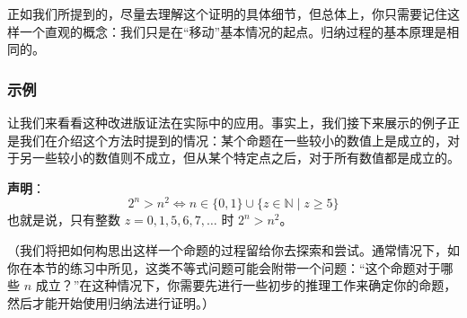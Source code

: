 正如我们所提到的，尽量去理解这个证明的具体细节，但总体上，你只需要记住这样一个直观的概念：我们只是在``移动''基本情况的起点。归纳过程的基本原理是相同的。

\subsubsection*{示例}

让我们来看看这种改进版证法在实际中的应用。事实上，我们接下来展示的例子正是我们在介绍这个方法时提到的情况：某个命题在一些较小的数值上是成立的，对于另一些较小的数值则不成立，但从某个特定点之后，对于所有数值都是成立的。\\

\begin{example}[比较 $2^n$ 与 $n^2$ 的大小]

    \textbf{声明}：
    \[2^n > n^2 \iff n \in \{0,1\} \cup \{z \in \mathbb{N} \mid z \ge 5\}\]
    也就是说，只有整数 $z=0,1,5,6,7,\dots$ 时 $2^n > n^2$。
\end{example}

（我们将把如何构思出这样一个命题的过程留给你去探索和尝试。通常情况下，如你在本节的练习中所见，这类不等式问题可能会附带一个问题：``这个命题对于哪些 $n$ 成立？''在这种情况下，你需要先进行一些初步的推理工作来确定你的命题，然后才能开始使用归纳法进行证明。）

